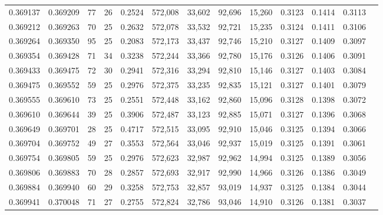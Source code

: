 \begin{tabular}{rrrrrrrrrrrrr}
0.369137 & 0.369209 &    77 &  26 &                                     0.2524 & 572,008 &  33,602 &  92,696 &  15,260 & 0.3123 & 0.1414 & 0.3113 \\
0.369212 & 0.369263 &    70 &  25 &                                     0.2632 & 572,078 &  33,532 &  92,721 &  15,235 & 0.3124 & 0.1411 & 0.3106 \\
0.369264 & 0.369350 &    95 &  25 &                                     0.2083 & 572,173 &  33,437 &  92,746 &  15,210 & 0.3127 & 0.1409 & 0.3097 \\
0.369354 & 0.369428 &    71 &  34 &                                     0.3238 & 572,244 &  33,366 &  92,780 &  15,176 & 0.3126 & 0.1406 & 0.3091 \\
0.369433 & 0.369475 &    72 &  30 &                                     0.2941 & 572,316 &  33,294 &  92,810 &  15,146 & 0.3127 & 0.1403 & 0.3084 \\
0.369475 & 0.369552 &    59 &  25 &                                     0.2976 & 572,375 &  33,235 &  92,835 &  15,121 & 0.3127 & 0.1401 & 0.3079 \\
0.369555 & 0.369610 &    73 &  25 &                                     0.2551 & 572,448 &  33,162 &  92,860 &  15,096 & 0.3128 & 0.1398 & 0.3072 \\
0.369610 & 0.369644 &    39 &  25 &                                     0.3906 & 572,487 &  33,123 &  92,885 &  15,071 & 0.3127 & 0.1396 & 0.3068 \\
0.369649 & 0.369701 &    28 &  25 &                                     0.4717 & 572,515 &  33,095 &  92,910 &  15,046 & 0.3125 & 0.1394 & 0.3066 \\
0.369704 & 0.369752 &    49 &  27 &                                     0.3553 & 572,564 &  33,046 &  92,937 &  15,019 & 0.3125 & 0.1391 & 0.3061 \\
0.369754 & 0.369805 &    59 &  25 &                                     0.2976 & 572,623 &  32,987 &  92,962 &  14,994 & 0.3125 & 0.1389 & 0.3056 \\
0.369806 & 0.369883 &    70 &  28 &                                     0.2857 & 572,693 &  32,917 &  92,990 &  14,966 & 0.3126 & 0.1386 & 0.3049 \\
0.369884 & 0.369940 &    60 &  29 &                                     0.3258 & 572,753 &  32,857 &  93,019 &  14,937 & 0.3125 & 0.1384 & 0.3044 \\
0.369941 & 0.370048 &    71 &  27 &                                     0.2755 & 572,824 &  32,786 &  93,046 &  14,910 & 0.3126 & 0.1381 & 0.3037 \\

\end{tabular}

